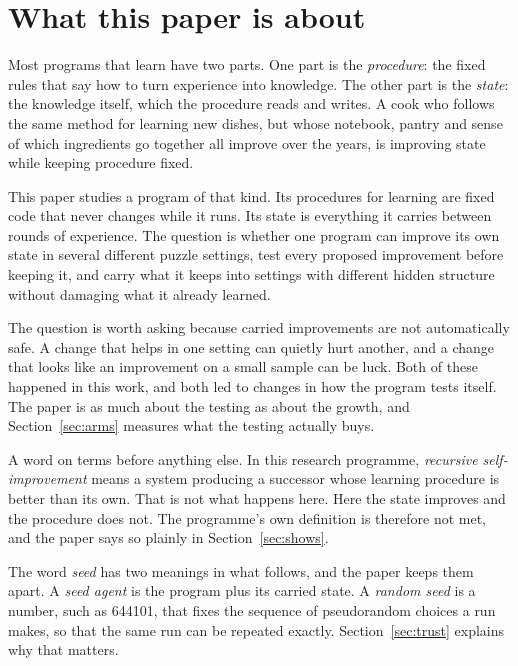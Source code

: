 \documentclass[11pt]{article}
\begin{document}
\begin{abstract}
limits that an audit of its own records found. The largest is that the agent starts without building blocks that every setting uses, so about a third of its measured growth is open to a start that was simply not held back. The paper also records what went wrong along the way, because each failure changed the design, and that record is as much the result as the growth is.
\end{abstract}

\section{What this paper is about}

Most programs that learn have two parts. One part is the \emph{procedure}: the fixed rules that say how to turn experience into knowledge. The other part is the \emph{state}: the knowledge itself, which the procedure reads and writes. A cook who follows the same method for learning new dishes, but whose notebook, pantry and sense of which ingredients go together all improve over the years, is improving state while keeping procedure fixed.

This paper studies a program of that kind. Its procedures for learning are fixed code that never changes while it runs. Its state is everything it carries between rounds of experience. The question is whether one program can improve its own state in several different puzzle settings, test every proposed improvement before keeping it, and carry what it keeps into settings with different hidden structure without damaging what it already learned.

The question is worth asking because carried improvements are not automatically safe. A change that helps in one setting can quietly hurt another, and a change that looks like an improvement on a small sample can be luck. Both of these happened in this work, and both led to changes in how the program tests itself. The paper is as much about the testing as about the growth, and Section~\ref{sec:arms} measures what the testing actually buys.

A word on terms before anything else. In this research programme, \emph{recursive self-improvement} means a system producing a successor whose learning procedure is better than its own. That is not what happens here. Here the state improves and the procedure does not. The programme's own definition is therefore not met, and the paper says so plainly in Section~\ref{sec:shows}.

The word \emph{seed} has two meanings in what follows, and the paper keeps them apart. A \emph{seed agent} is the program plus its carried state. A \emph{random seed} is a number, such as 644101, that fixes the sequence of pseudorandom choices a run makes, so that the same run can be repeated exactly. Section~\ref{sec:trust} explains why that matters.
\end{document}
